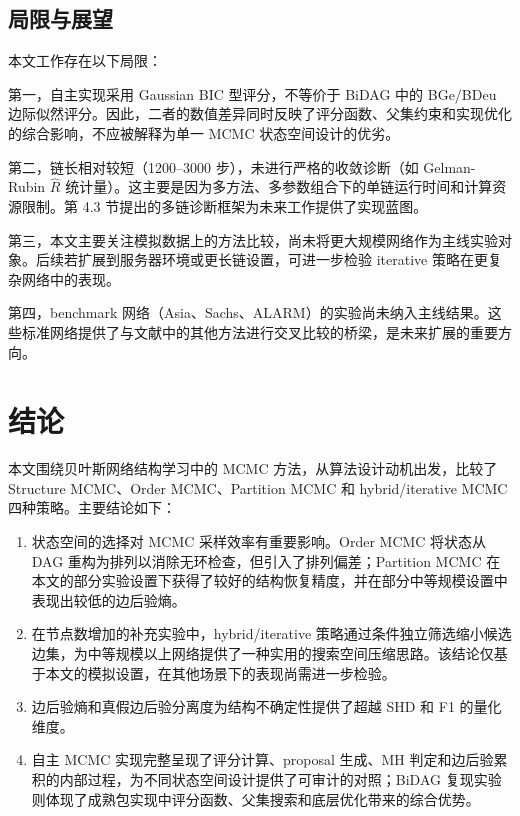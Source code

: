 \documentclass[UTF8,a4paper,12pt]{ctexart}
\begin{document}
\subsection{局限与展望}

本文工作存在以下局限：

第一，自主实现采用 Gaussian BIC 型评分，不等价于 BiDAG 中的 BGe/BDeu 边际似然评分。因此，二者的数值差异同时反映了评分函数、父集约束和实现优化的综合影响，不应被解释为单一 MCMC 状态空间设计的优劣。

第二，链长相对较短（1200--3000 步），未进行严格的收敛诊断（如 Gelman-Rubin $\hat{R}$ 统计量）。这主要是因为多方法、多参数组合下的单链运行时间和计算资源限制。第 4.3 节提出的多链诊断框架为未来工作提供了实现蓝图。

第三，本文主要关注模拟数据上的方法比较，尚未将更大规模网络作为主线实验对象。后续若扩展到服务器环境或更长链设置，可进一步检验 iterative 策略在更复杂网络中的表现。

第四，benchmark 网络（Asia、Sachs、ALARM）的实验尚未纳入主线结果。这些标准网络提供了与文献中的其他方法进行交叉比较的桥梁，是未来扩展的重要方向。

\FloatBarrier
\newpage
\section{结论}

本文围绕贝叶斯网络结构学习中的 MCMC 方法，从算法设计动机出发，比较了 Structure MCMC、Order MCMC、Partition MCMC 和 hybrid/iterative MCMC 四种策略。主要结论如下：

\begin{enumerate}
  \item 状态空间的选择对 MCMC 采样效率有重要影响。Order MCMC 将状态从 DAG 重构为排列以消除无环检查，但引入了排列偏差；Partition MCMC 在本文的部分实验设置下获得了较好的结构恢复精度，并在部分中等规模设置中表现出较低的边后验熵。
  \item 在节点数增加的补充实验中，hybrid/iterative 策略通过条件独立筛选缩小候选边集，为中等规模以上网络提供了一种实用的搜索空间压缩思路。该结论仅基于本文的模拟设置，在其他场景下的表现尚需进一步检验。
  \item 边后验熵和真假边后验分离度为结构不确定性提供了超越 SHD 和 F1 的量化维度。
  \item 自主 MCMC 实现完整呈现了评分计算、proposal 生成、MH 判定和边后验累积的内部过程，为不同状态空间设计提供了可审计的对照；BiDAG 复现实验则体现了成熟包实现中评分函数、父集搜索和底层优化带来的综合优势。
\end{enumerate}
\end{document}

